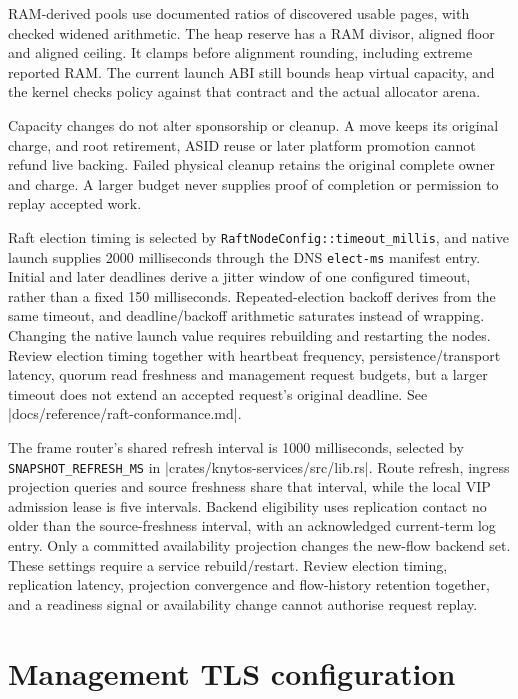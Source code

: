 RAM-derived pools use documented ratios of discovered usable pages, with
checked widened arithmetic. The heap reserve has a RAM divisor, aligned floor
and aligned ceiling. It clamps before alignment rounding, including extreme
reported RAM. The current launch ABI still bounds heap virtual capacity, and the
kernel checks policy against that contract and the actual allocator arena.

Capacity changes do not alter sponsorship or cleanup. A move keeps its original
charge, and root retirement, ASID reuse or later platform promotion cannot refund
live backing. Failed physical cleanup retains the original complete owner and
charge. A larger budget never supplies proof of completion or permission to
replay accepted work.

Raft election timing is selected by
\texttt{RaftNodeConfig::timeout\_millis}, and native launch supplies 2000 milliseconds
through the DNS \texttt{elect-ms} manifest entry. Initial and later
deadlines derive a jitter window of one configured timeout, rather than a fixed
150 milliseconds. Repeated-election backoff derives from the same timeout, and
deadline/backoff arithmetic saturates instead of wrapping. Changing the native
launch value requires rebuilding and restarting the nodes. Review election
timing together with heartbeat frequency, persistence/transport latency, quorum
read freshness and management request budgets, but a larger timeout does not extend
an accepted request's original deadline. See
\repofile|docs/reference/raft-conformance.md|.

The frame router's shared refresh interval is 1000 milliseconds, selected by
\texttt{SNAPSHOT\_REFRESH\_MS} in
\repofile|crates/knytos-services/src/lib.rs|. Route refresh, ingress projection
queries and source freshness share that interval, while the local VIP admission lease
is five intervals. Backend eligibility uses replication contact no older than
the source-freshness interval, with an acknowledged current-term log entry.
Only a committed availability projection changes the new-flow backend set.
These settings require a service rebuild/restart. Review election timing,
replication latency, projection convergence and flow-history retention together, and
a readiness signal or availability change cannot authorise request replay.

\section{Management TLS configuration}

